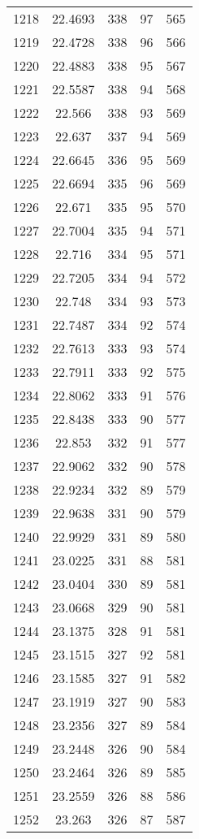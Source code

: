 \documentclass[12pt,a4paper]{article}
\begin{document}
\begin{tabular}{r|cccc}
	1218 & 22.4693 & 338 & 97 & 565 \\
	1219 & 22.4728 & 338 & 96 & 566 \\
	1220 & 22.4883 & 338 & 95 & 567 \\
	1221 & 22.5587 & 338 & 94 & 568 \\
	1222 & 22.566 & 338 & 93 & 569 \\
	1223 & 22.637 & 337 & 94 & 569 \\
	1224 & 22.6645 & 336 & 95 & 569 \\
	1225 & 22.6694 & 335 & 96 & 569 \\
	1226 & 22.671 & 335 & 95 & 570 \\
	1227 & 22.7004 & 335 & 94 & 571 \\
	1228 & 22.716 & 334 & 95 & 571 \\
	1229 & 22.7205 & 334 & 94 & 572 \\
	1230 & 22.748 & 334 & 93 & 573 \\
	1231 & 22.7487 & 334 & 92 & 574 \\
	1232 & 22.7613 & 333 & 93 & 574 \\
	1233 & 22.7911 & 333 & 92 & 575 \\
	1234 & 22.8062 & 333 & 91 & 576 \\
	1235 & 22.8438 & 333 & 90 & 577 \\
	1236 & 22.853 & 332 & 91 & 577 \\
	1237 & 22.9062 & 332 & 90 & 578 \\
	1238 & 22.9234 & 332 & 89 & 579 \\
	1239 & 22.9638 & 331 & 90 & 579 \\
	1240 & 22.9929 & 331 & 89 & 580 \\
	1241 & 23.0225 & 331 & 88 & 581 \\
	1242 & 23.0404 & 330 & 89 & 581 \\
	1243 & 23.0668 & 329 & 90 & 581 \\
	1244 & 23.1375 & 328 & 91 & 581 \\
	1245 & 23.1515 & 327 & 92 & 581 \\
	1246 & 23.1585 & 327 & 91 & 582 \\
	1247 & 23.1919 & 327 & 90 & 583 \\
	1248 & 23.2356 & 327 & 89 & 584 \\
	1249 & 23.2448 & 326 & 90 & 584 \\
	1250 & 23.2464 & 326 & 89 & 585 \\
	1251 & 23.2559 & 326 & 88 & 586 \\
	1252 & 23.263 & 326 & 87 & 587 \\

\end{tabular}
\end{document}
